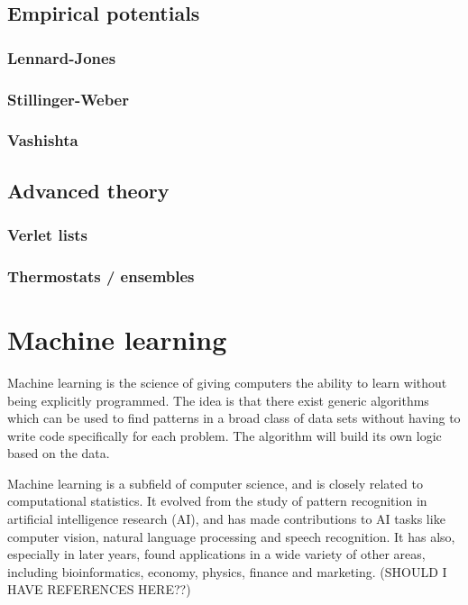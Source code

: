 \documentclass[twoside,english]{uiofysmaster}
\begin{document}
\section{Empirical potentials}

\subsection{Lennard-Jones}

\subsection{Stillinger-Weber}

\subsection{Vashishta}


\section{Advanced theory}

\subsection{Verlet lists}

\subsection{Thermostats / ensembles}



\chapter{Machine learning}
Machine learning is the science of giving computers the ability to learn without being explicitly programmed. 
The idea is that there exist generic algorithms which can be used to find patterns in a broad class of data sets without 
having to write code specifically for each problem. The algorithm will build its own logic based on the data.  

Machine learning is a subfield of computer science, and is closely related to computational statistics. 
It evolved from the study of pattern recognition in artificial intelligence research (AI), and has made contributions to
AI tasks like computer vision, natural language processing and speech recognition. It has also, especially in later years, 
found applications in a wide variety of other areas, including bioinformatics, economy, physics, finance and marketing. 
(SHOULD I HAVE REFERENCES HERE??)
\end{document}
